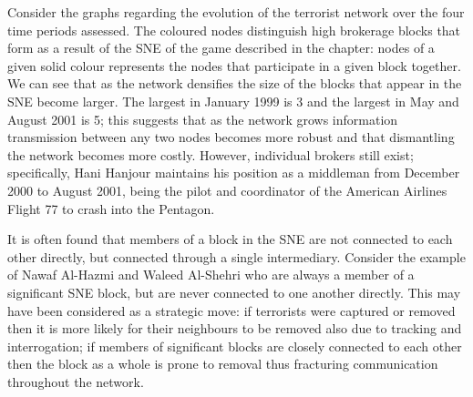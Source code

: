 Consider the graphs regarding the evolution of the terrorist network over the four time periods assessed. The coloured nodes distinguish high brokerage blocks that form as a result of the SNE of the game described in the chapter: nodes of a given solid colour represents the nodes that participate in a given block together. We can see that as the network densifies the size of the blocks that appear in the SNE become larger. The largest in January 1999 is 3 and the largest in May and August 2001 is 5; this suggests that as the network grows information transmission between any two nodes becomes more robust and that dismantling the network becomes more costly. However, individual brokers still exist; specifically, Hani Hanjour maintains his position as a middleman from December 2000 to August 2001, being the pilot and coordinator of the American Airlines Flight 77 to crash into the Pentagon.

It is often found that members of a block in the SNE are not connected to each other directly, but connected through a single intermediary. Consider the example of Nawaf Al-Hazmi and Waleed Al-Shehri who are always a member of a significant SNE block, but are never connected to one another directly. This may have been considered as a strategic move: if terrorists were captured or removed then it is more likely for their neighbours to be removed also due to tracking and interrogation; if members of significant blocks are closely connected to each other then the block as a whole is prone to removal thus fracturing communication throughout the network.

